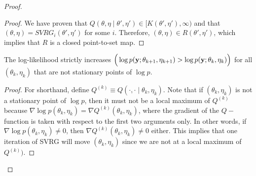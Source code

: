 \begin{proof}
\begin{proof}
    We have proven that $Q(\theta, \eta \mid \theta', \eta') \in [K(\theta',\eta'),\infty)$ and that $(\theta,\eta) = SVRG_i(\theta',\eta')$ for some $i$. Therefore, $(\theta,\eta) \in R(\theta',\eta')$, which implies that $R$ is a closed point-to-set map.
\end{proof}

\begin{lemma}
    The log-likelihood strictly increases $\Big(\log p(\mathbf{y};\theta_{k+1},\eta_{k+1}) > \log p(\mathbf{y};\theta_k,\eta_k)\Big)$ for all $(\theta_k,\eta_k)$ that are not stationary points of $\log p$.
\end{lemma}

\begin{proof}

For shorthand, define $Q^{(k)} \equiv Q(\cdot,\cdot \mid \theta_k,\eta_k)$. Note that if $(\theta_k,\eta_k)$ is not a stationary point of $\log p$, then it must not be a local maximum of $Q^{(k)}$ because $\nabla \log p(\theta_k,\eta_k) = \nabla Q^{(k)}(\theta_k,\eta_k)$, where the gradient of the $Q-$ function is taken with respect to the first two arguments only. In other words, if $\nabla \log p(\theta_k,\eta_k) \neq 0$, then $\nabla Q^{(k)}(\theta_k,\eta_k) \neq 0$ either. This implies that one iteration of SVRG will move $(\theta_k,\eta_k)$ since we are not at a local maximum of $Q^{(k)})$.


\end{proof}
\end{proof}
